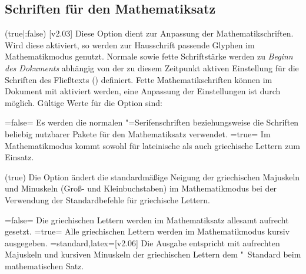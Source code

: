\begin{DeclareEntity*}{}
\begin{DeclareEntity*}{}
\begin{DeclareEntity*}{}
\subsection{%
  Schriften für den Mathematiksatz%
  \label{sec:math}%
}
%
\begin{Declaration}
  {}
  (true|:false)
  [v2.03]
\printdeclarationlist
%
Diese Option dient zur Anpassung der Mathematikschriften. Wird diese aktiviert, 
so werden zur Hausschrift passende Glyphen im Mathematikmodus genutzt. Normale 
sowie fette Schriftstärke werden zu \emph{Beginn des Dokuments} abhängig von 
der zu diesem Zeitpunkt aktiven Einstellung für die Schriften des Fließtexts 
() definiert. Fette Mathematikschriften 
können im Dokument mit  aktiviert werden, eine Anpassung der 
Einstellungen ist durch  möglich. Gültige Werte für die 
Option  sind:
\begin{DeclareValues}
\itemval=false=
  Es werden die normalen "=Serifenschriften beziehungsweise die 
  Schriften beliebig nutzbarer Pakete für den Mathematiksatz verwendet.
\itemval*=true=
  Im Mathematikmodus kommt \OpenSans sowohl für lateinische als auch 
  griechische Lettern zum Einsatz.
\end{DeclareValues}
\end{Declaration}

\begin{Declaration}
  {}
  (true)
Die Option ändert die standardmäßige Neigung der griechischen Majuskeln und 
Minuskeln (Groß- und Kleinbuchstaben) im Mathematikmodus bei der Verwendung 
der Standardbefehle für griechische Lettern.
\begin{DeclareValues}
\itemval=false=
  Die griechischen Lettern werden im Mathematiksatz allesamt aufrecht gesetzt.
\itemval*=true=
  Alle griechischen Lettern werden im Mathematikmodus kursiv ausgegeben.
\itemval=standard,latex=[v2.06]
  Die Ausgabe entspricht mit aufrechten Majuskeln und kursiven Minuskeln der 
  griechischen Lettern dem "~Standard beim mathematischen Satz.
\end{DeclareValues}
\end{Declaration}


\end{DeclareEntity*}
\end{DeclareEntity*}
\end{DeclareEntity*}
